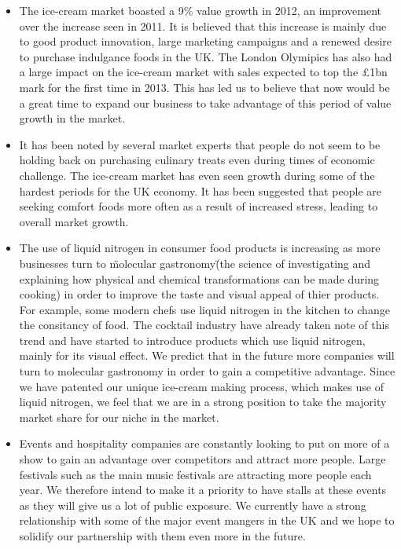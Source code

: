 \documentclass{article}
\begin{document}
  \begin{itemize}
  \item The ice-cream market boasted a 9\% value growth in 2012, an improvement over the increase seen in 2011. It is believed that this increase is mainly due to good product innovation, large marketing campaigns and a renewed desire to purchase indulgance foods in the UK. The London Olymipics has also had a large impact on the ice-cream market with sales expected to top the £1bn mark for the first time in 2013. This has led us to believe that now would be a great time to expand our business to take advantage of this period of value growth in the market.

  \item It has been noted by several market experts that people do not seem to be holding back on purchasing culinary treats even during times of economic challenge. The ice-cream market has even seen growth during some of the hardest periods for the UK economy. It has been suggested that people are seeking comfort foods more often as a result of increased stress, leading to overall market growth.

  \item The use of liquid nitrogen in consumer food products is increasing as more businesses turn to \"molecular gastronomy\" (the science of investigating and explaining how physical and chemical transformations can be made during cooking) in order to improve the taste and visual appeal of thier products. For example, some modern chefs use liquid nitrogen in the kitchen to change the consitancy of food. The cocktail industry have already taken note of this trend and have started to introduce products which use liquid nitrogen, mainly for its visual effect. We predict that in the future more companies will turn to molecular gastronomy in order to gain a competitive advantage. Since we have patented our unique ice-cream making process, which makes use of liquid nitrogen, we feel that we are in a strong position to take the majority market share for our niche in the market. 

  \item Events and hospitality companies are constantly looking to put on more of a show to gain an advantage over competitors and attract more people. Large festivals such as the main music festivals are attracting more people each year. We therefore intend to make it a priority to have stalls at these events as they will give us a lot of public exposure. We currently have a strong relationship with some of the major event mangers in the UK and we hope to solidify our partnership with them even more in the future.


\end{itemize}
\end{document}
